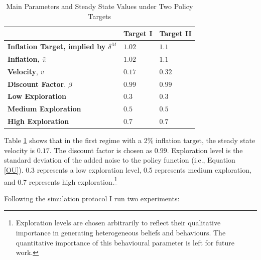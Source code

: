 \documentclass[hidelinks]{article}
\begin{document}
 \begin{table}[H]
 	\centering	
 	\caption{Main Parameters and Steady State Values under Two Policy Targets}	
 	\label{2target}	
 	\begin{tabular}{@{}lll@{}}\\ \hline \hline				
 		& \textbf{Target I} & \textbf{Target II} \\  \hline		
 		\vspace{0.5cm}		
 		\textbf{Inflation Target, implied by $\delta^M$} &$1.02$ & $1.1$ \\
		\vspace{0.5cm}		
 		\textbf{Inflation, $\bar{\pi}$} &$1.02$ & $1.1$ \\
 		\vspace{0.5cm}		
 		\textbf{Velocity}, $\bar{v}$& $0.17$& $0.32$ \\	
 		\vspace{0.5cm}		
 		\textbf{Discount Factor}, $\beta$& $0.99$& $0.99$ \\  
 		 		\vspace{0.5cm}		
 		\textbf{Low Exploration}& $0.3$& $0.3$ \\	
 		 		\vspace{0.5cm}		
 		\textbf{Medium Exploration}& $0.5$& $0.5$ \\	
 		 		\vspace{0.5cm}		
 		\textbf{High Exploration}& $0.7$& $0.7$ \\	\hline \hline
	\end{tabular}
 	
 \end{table}
 
 Table \ref{2target} shows that in the first regime with a 2\% inflation target, the steady state velocity is $0.17$. The discount factor is chosen as $0.99$. Exploration level is the standard deviation of the added noise to the policy function (i.e., Equation \ref{OU}). 0.3 represents a low exploration level, 0.5 represents medium exploration, and 0.7 represents high exploration.\footnote{Exploration levels are chosen arbitrarily to reflect their qualitative importance in generating heterogeneous beliefs and behaviours. The quantitative importance of this behavioural parameter is left for future work.} 

 
 Following the simulation protocol I run two experiments:
 
\end{document}
